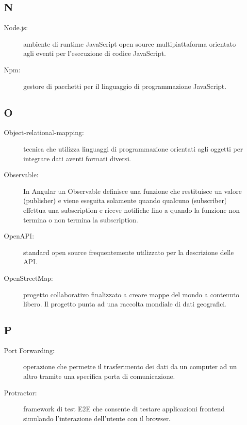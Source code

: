 \documentclass[../manuale-manutentore.tex]{subfiles}
\begin{document}
\subsection{N}

\begin{description}
  \item[Node.js:] ambiente di runtime JavaScript open source multipiattaforma orientato agli eventi per l'esecuzione di codice JavaScript.
  \item[Npm:] gestore di pacchetti per il linguaggio di programmazione JavaScript.
\end{description}

\subsection{O}

\begin{description}
    \item[Object-relational-mapping:] tecnica che utilizza linguaggi di programmazione orientati agli oggetti per integrare dati aventi formati diversi.
    \item[Observable:] In Angular un Observable definisce una funzione che restituisce un valore (publisher) e viene eseguita solamente quando qualcuno (subscriber) effettua una subscription e riceve notifiche fino a quando la funzione non termina o non termina la subscription.
    \item[OpenAPI:] standard open source frequentemente utilizzato per la descrizione delle API\@.
    \item[OpenStreetMap:] progetto collaborativo finalizzato a creare mappe del mondo a contenuto libero. Il progetto punta ad una raccolta mondiale di dati geografici.
\end{description}

\subsection{P}

\begin{description}
    \item[Port Forwarding:] operazione che permette il trasferimento dei dati da un computer ad un altro tramite una specifica porta di comunicazione.
    \item[Protractor:] framework di test E2E che consente di testare applicazioni frontend simulando l'interazione dell'utente con il browser.
\end{description}
\end{document}
